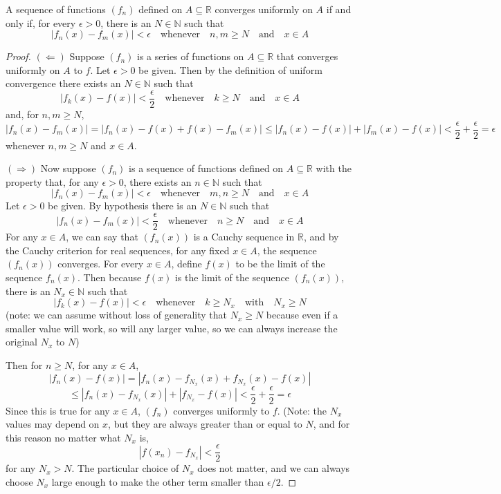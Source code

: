 \par\vspace{0.3 cm}
\begin{theorem*}  A sequence of functions $(f_n)$ defined on $A\subseteq\mathbb{R}$ converges uniformly on $A$ if and only if, for every $\epsilon>0$, there is an $N\in\mathbb{N}$ such that
\[
|f_n(x)-f_m(x)|<\epsilon\quad\mbox{whenever}\quad n,m\geq N\quad\mbox{and}\quad x\in A
\]
\end{theorem*}
\begin{proof}
$(\Leftarrow)$ Suppose $(f_n)$ is a series of functions on $A\subseteq\mathbb{R}$ that converges uniformly on $A$ to $f$.  Let $\epsilon>0$ be given.  Then by the definition of uniform convergence there exists an $N\in\mathbb{N}$ such that
\[
|f_k(x)-f(x)|<\frac{\epsilon}{2}\quad\mbox{whenever}\quad k\geq N\quad\mbox{and}\quad x\in A 
\]
and, for $n,m\geq N$, 
\[
|f_n(x)-f_m(x)| = |f_n(x)-f(x)+f(x)-f_m(x)| \leq |f_n(x)-f(x)|+|f_m(x)-f(x)| < \frac{\epsilon}{2}+\frac{\epsilon}{2} = \epsilon
\]
whenever $n,m\geq N$ and $x\in A$.
\par\vspace{0.6 cm}
$(\Rightarrow)$ Now suppose $(f_n)$ is a sequence of functions defined on $A\subseteq\mathbb{R}$ with the property that, for any $\epsilon>0$, there exists an $n\in\mathbb{N}$ such that
\[
|f_n(x)-f_m(x)|<\epsilon\quad\mbox{whenever}\quad m,n\geq N\quad\mbox{and}\quad x\in A
\]  
Let $\epsilon>0$ be given.  By hypothesis there is an $N\in\mathbb{N}$ such that
\[
|f_n(x)-f_m(x)| < \frac{\epsilon}{2}\quad\mbox{whenever}\quad n\geq N\quad\mbox{and}\quad x\in A
\]
For any $x\in A$, we can say that $(f_n(x))$ is a Cauchy sequence in $\mathbb{R}$, and by the Cauchy criterion for real sequences, for any fixed $x\in A$, the sequence $(f_n(x))$ converges.  For every $x\in A$, define $f(x)$ to be the 
limit of the sequence $f_n(x)$.  Then because $f(x)$ is the limit of the sequence $(f_n(x))$, there is 
an $N_x\in\mathbb{N}$ such that
\[
|f_k(x)-f(x)|<\epsilon\quad\mbox{whenever}\quad k\geq N_x\quad\mbox{with}\quad N_x\geq N
\]   
(note: we can assume without loss of generality that $N_x\geq N$ because even if a smaller value will work, so will any larger value, so we can always increase the original $N_x$ to $N$)
\par\vspace{0.5 cm} 
Then for $n\geq N$, for any $x\in A$,
\[
|f_n(x)-f(x)| = |f_n(x)-f_{N_x}(x)+f_{N_x}(x)-f(x)|
\]
\[
\leq |f_n(x)-f_{N_x}(x)| + |f_{N_x}-f(x)| < \frac{\epsilon}{2}+\frac{\epsilon}{2} = \epsilon
\]
Since this is true for any $x\in A$, $(f_n)$ converges uniformly to $f$. (Note: the $N_x$ values may depend on $x$, but they are always greater than or equal to $N$, and for this reason no matter what $N_x$ is,
\[
|f(x_n)-f_{N_x}|<\frac{\epsilon}{2}
\]
for any $N_x>N$.  The particular choice of $N_x$ does not matter, and we can always choose $N_x$ large enough to make the other term smaller than $\epsilon/2$.

\end{proof}
